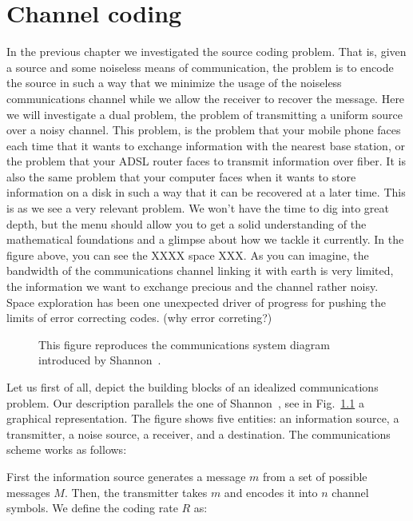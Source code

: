 \usechapterimagetrue
{} %
\chapter{Channel coding}
\usechapterimagefalse

In the previous chapter we investigated the source coding problem. That is, given a source and some noiseless means of communication, the problem is to encode the source in such a way that we minimize the usage of the noiseless communications channel while we allow the receiver to recover the message. Here we will investigate a dual problem, the problem of transmitting a uniform source over a noisy channel. This problem, is the problem that your mobile phone faces each time that it wants to exchange information with the nearest base station, or the problem that your ADSL router faces to transmit information over fiber. It is also the same problem that your computer faces when it wants to store information on a disk in such a way that it can be recovered at a later time. This is as we see a very relevant problem. We won't have the time to dig into great depth, but the menu should allow you to get a solid understanding of the mathematical foundations and a glimpse about how we tackle it currently. In the figure above, you can see the XXXX space XXX. As you can imagine, the bandwidth of the communications channel linking it with earth is very limited, the information we want to exchange precious and the channel rather noisy. Space exploration has been one unexpected driver of progress for pushing the limits of error correcting codes. (why error correting?)
\begin{figure}[h!]
\begin{center}
\def\svgwidth{\columnwidth} 

\end{center}
\caption[Communications system diagram.]{This figure reproduces the communications system diagram introduced by Shannon~\cite{Shannon_48}.}
\label{fig:shannoncom}
\end{figure}
Let us first of all, depict the building blocks of an idealized communications problem. Our description parallels the one of Shannon~\cite{Shannon_48}, see in Fig.~\ref{fig:shannoncom} a graphical representation. The figure shows five entities: an information source, a transmitter, a noise source, a receiver, and a destination. The communications scheme works as follows: 

First the information source generates a message $m$ from a set of possible messages $M$. Then, the transmitter takes $m$ and encodes it into $n$ channel symbols. We define the coding rate $R$ as:

